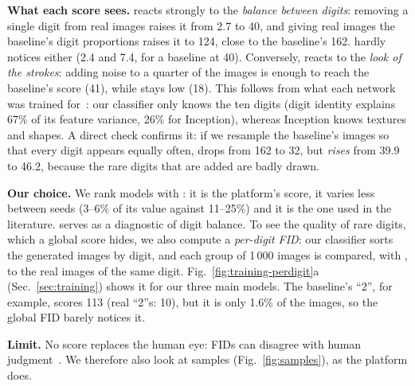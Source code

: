 \textbf{What each score sees.} \fcnn{} reacts strongly to the \emph{balance between digits}: removing a single digit from
real images raises it from 2.7 to 40, and giving real images the baseline's digit proportions raises it to 124, close to
the baseline's 162. \finc{} hardly notices either (2.4 and 7.4, for a baseline at 40). Conversely, \finc{} reacts to the
\emph{look of the strokes}: adding noise to a quarter of the images is enough to reach the baseline's score (41), while
\fcnn{} stays low (18). This follows from what each network was trained for~\cite{kynkaanniemi2023}:
our classifier only knows the ten digits (digit identity explains 67\% of its feature variance, 26\% for Inception),
whereas Inception knows textures and shapes. A direct check confirms it: if we resample the baseline's images so that every
digit appears equally often, \fcnn{} drops from 162 to 32, but \finc{} \emph{rises} from 39.9 to 46.2, because the rare digits
that are added are badly drawn.

\textbf{Our choice.} We rank models with \finc{}: it is the platform's score, it varies less between seeds (3--6\% of its
value against 11--25\%) and it is the one used in the literature. \fcnn{} serves as a diagnostic of digit balance. To see
the quality of rare digits, which a global score hides, we also compute a \emph{per-digit FID}: our classifier sorts the
generated images by digit, and each group of 1\,000 images is compared, with \finc{}, to the real images of the same
digit. Fig.~\ref{fig:training-perdigit}a (Sec.~\ref{sec:training}) shows it for our three main models. The baseline's
``2'', for example, scores 113 (real ``2''s: 10), but it is only 1.6\% of the images, so the global FID barely notices it.

\textbf{Limit.} No score replaces the human eye: FIDs can disagree with human judgment~\cite{stein2023}. We therefore also
look at samples (Fig.~\ref{fig:samples}), as the platform does.

